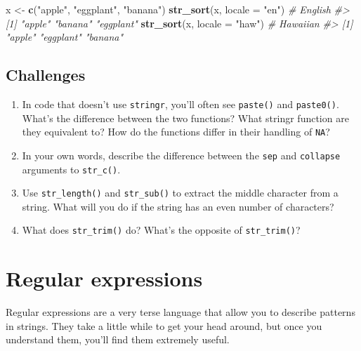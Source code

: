 \documentclass[]{book}
\newenvironment{Shaded}{\begin{snugshade}}{\end{snugshade}}
\newcommand{\CommentTok}[1]{\textcolor[rgb]{0.56,0.35,0.01}{\textit{#1}}}
\newcommand{\DataTypeTok}[1]{\textcolor[rgb]{0.13,0.29,0.53}{#1}}
\newcommand{\KeywordTok}[1]{\textcolor[rgb]{0.13,0.29,0.53}{\textbf{#1}}}
\newcommand{\NormalTok}[1]{#1}
\newcommand{\StringTok}[1]{\textcolor[rgb]{0.31,0.60,0.02}{#1}}
\begin{document}
\begin{Shaded}
\begin{Highlighting}[]
\NormalTok{x <-}\StringTok{ }\KeywordTok{c}\NormalTok{(}\StringTok{"apple"}\NormalTok{, }\StringTok{"eggplant"}\NormalTok{, }\StringTok{"banana"}\NormalTok{)}
\KeywordTok{str_sort}\NormalTok{(x, }\DataTypeTok{locale =} \StringTok{"en"}\NormalTok{)  }\CommentTok{# English}
\CommentTok{#> [1] "apple"    "banana"   "eggplant"}
\KeywordTok{str_sort}\NormalTok{(x, }\DataTypeTok{locale =} \StringTok{"haw"}\NormalTok{) }\CommentTok{# Hawaiian}
\CommentTok{#> [1] "apple"    "eggplant" "banana"}
\end{Highlighting}
\end{Shaded}

\hypertarget{challenges-15}{%
\subsection*{Challenges}\label{challenges-15}}

\begin{enumerate}
\def\labelenumi{\arabic{enumi}.}
\item
  In code that doesn't use \texttt{stringr}, you'll often see \texttt{paste()} and \texttt{paste0()}.
  What's the difference between the two functions? What stringr function are
  they equivalent to? How do the functions differ in their handling of
  \texttt{NA}?
\item
  In your own words, describe the difference between the \texttt{sep} and \texttt{collapse}
  arguments to \texttt{str\_c()}.
\item
  Use \texttt{str\_length()} and \texttt{str\_sub()} to extract the middle character from
  a string. What will you do if the string has an even number of characters?
\item
  What does \texttt{str\_trim()} do? What's the opposite of \texttt{str\_trim()}?
\end{enumerate}

\hypertarget{regular-expressions}{%
\section{Regular expressions}\label{regular-expressions}}

Regular expressions are a very terse language that allow you to describe patterns in strings. They take a little while to get your head around, but once you understand them, you'll find them extremely useful.
\end{document}
